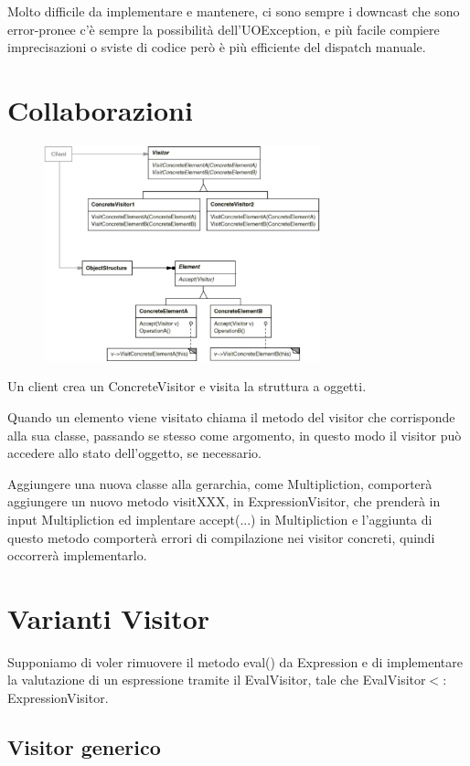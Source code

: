 Molto difficile da implementare e mantenere, ci sono sempre i downcast che sono error-pronee c’è sempre la possibilità dell’UOException, e più facile compiere 
imprecisazioni o sviste di codice però è più efficiente del dispatch manuale.

\section{Collaborazioni}

\begin{figure}[H]
  \centering
  \includegraphics[width=8cm]{../../immagini/visitor/struttura_visitor}
\end{figure}

Un client crea un ConcreteVisitor e visita la struttura a oggetti.

Quando un elemento viene visitato chiama il metodo del visitor che corrisponde alla sua classe, passando se stesso come argomento, in questo modo il visitor può 
accedere allo stato dell’oggetto, se necessario.
\smallskip

Aggiungere una nuova classe alla gerarchia, come Multipliction, comporterà aggiungere un nuovo metodo visitXXX, in ExpressionVisitor, che prenderà in input 
Multipliction ed implentare accept(...) in Multipliction e l'aggiunta di questo metodo comporterà errori di compilazione nei visitor concreti, quindi occorrerà 
implementarlo.

\section{Varianti Visitor}

Supponiamo di voler rimuovere il metodo eval() da Expression e di implementare la valutazione di un espressione tramite il EvalVisitor, tale che 
EvalVisitor$<:$ExpressionVisitor.

\subsection{Visitor generico}

